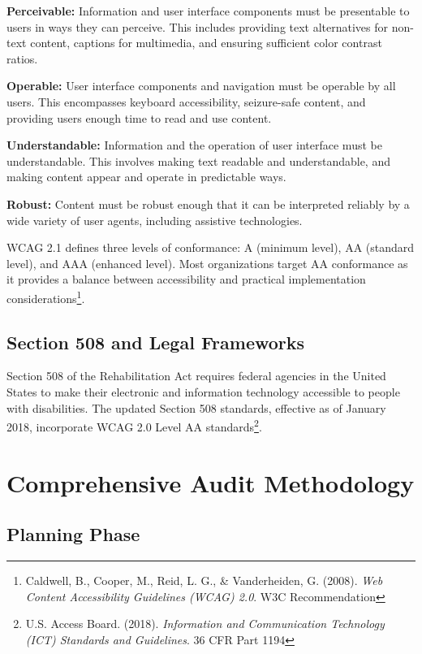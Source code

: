 \textbf{Perceivable:} Information and user interface components must be presentable to users in ways they can perceive. This includes providing text alternatives for non-text content, captions for multimedia, and ensuring sufficient color contrast ratios.

\textbf{Operable:} User interface components and navigation must be operable by all users. This encompasses keyboard accessibility, seizure-safe content, and providing users enough time to read and use content.

\textbf{Understandable:} Information and the operation of user interface must be understandable. This involves making text readable and understandable, and making content appear and operate in predictable ways.

\textbf{Robust:} Content must be robust enough that it can be interpreted reliably by a wide variety of user agents, including assistive technologies.

WCAG 2.1 defines three levels of conformance: A (minimum level), AA (standard level), and AAA (enhanced level). Most organizations target AA conformance as it provides a balance between accessibility and practical implementation considerations\footnote{Caldwell, B., Cooper, M., Reid, L. G., \& Vanderheiden, G. (2008). \textit{Web Content Accessibility Guidelines (WCAG) 2.0}. W3C Recommendation}.

\subsection{Section 508 and Legal Frameworks}

Section 508 of the Rehabilitation Act requires federal agencies in the United States to make their electronic and information technology accessible to people with disabilities. The updated Section 508 standards, effective as of January 2018, incorporate WCAG 2.0 Level AA standards\footnote{U.S. Access Board. (2018). \textit{Information and Communication Technology (ICT) Standards and Guidelines}. 36 CFR Part 1194}.

\section{Comprehensive Audit Methodology}

\subsection{Planning Phase}

